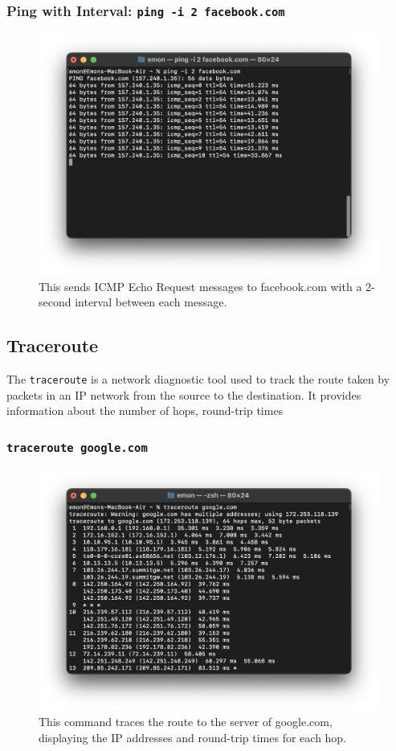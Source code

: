 \documentclass[11pt]{article}
\newcommand{\terminal}[1]{\texttt{\color{terminalcolor}#1}}
\begin{document}
\newpage
\subsubsection{Ping with Interval: \terminal{ping -i 2 facebook.com}}
\begin{figure}[!h]
    \centering
    \includegraphics[width=\textwidth]{ping3.png}
    \caption{This sends ICMP Echo Request messages to facebook.com with a 2-second interval between each message.}
\end{figure}

\newpage


\subsection{Traceroute}
The \terminal{traceroute} is a network diagnostic tool used to track the route taken by packets in an IP network from the source to the destination. It provides information about the number of hops, round-trip times
\subsubsection{\terminal{traceroute google.com}}
\begin{figure}[!h]
    \centering
    \includegraphics[width=\textwidth]{traceroute1.png}
    \caption{This command traces the route to the server of google.com, displaying the IP addresses and round-trip times for each hop.}
\end{figure}
\end{document}
